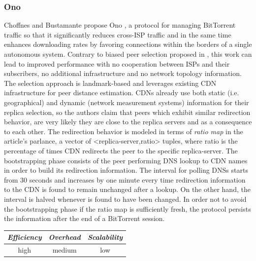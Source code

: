 \subsubsection{Ono}
Choffnes and Bustamante propose Ono \cite{CB2008}, a protocol for managing
BitTorrent traffic so that it significantly reduces cross-ISP traffic and in
the same time enhances downloading rates by favoring connections within the
borders of a single autonomous system. Contrary to biased peer selection
proposed in \cite{BCCMSBZ2006}, this work can lead to improved performance with
no cooperation between ISPs and their subscribers, no additional infrastructure
and no network topology information. The selection approach is landmark-based
and leverages existing CDN infrastructure for peer distance estimation. CDNs
already use both static (i.e. geographical) and dynamic (network measurement
systems) information for their replica selection, so the authors claim that
peers which exhibit similar redirection behavior, are very likely they are close
to the replica servers and as a consequence to each other. The redirection
behavior is modeled in terms of \emph{ratio map} in the article's parlance, a
vector of <replica-server,ratio> tuples, where ratio is the percentage of times
CDN redirects the peer to the specific replica-server. The bootstrapping phase
consists of the peer performing DNS lookup to CDN names in order to build its
redirection information. The interval for polling DNSs starts from 30 seconds
and increases by one minute every time redirection information to the CDN is
found to remain unchanged after a lookup. On the other hand, the interval is
halved whenever is found to have been changed. In order not to avoid the
bootstrapping phase if the ratio map is sufficiently fresh, the protocol
persists the information after the end of a BitTorrent session.

\begin{center}
\begin{tabular}{ccc}
\emph{Efficiency} & \emph{Overhead} & \emph{Scalability} \\
\hline
high &
medium &
low
\end{tabular}
\end{center}

